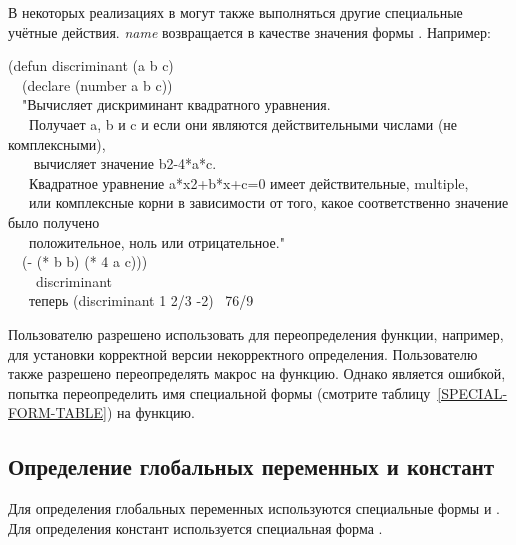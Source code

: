 \begin{defmac}
В некоторых реализациях в  могут также выполняться другие специальные
учётные действия. \emph{name} возвращается в качестве значения формы .
Например:
\begin{lisp}
(defun discriminant (a b c) \\
~~(declare (number a b c)) \\
~~"Вычисляет дискриминант квадратного уравнения. \\
~~~Получает a, b и c и если они являются действительными числами (не комплексными), \\
~~~ вычисляет значение b{\Xcircumflex}2-4*a*c. \\
~~~Квадратное уравнение a*x{\Xcircumflex}2+b*x+c=0 имеет действительные, multiple, \\
~~~или комплексные корни в зависимости от того, какое соответственно значение было получено \\
~~~положительное, ноль или отрицательное." \\
~~(- (* b b) (* 4 a c))) \\
~~~\EV\ discriminant \\
~~~\textrm{теперь} (discriminant 1 2/3 -2) \EV\ 76/9
\end{lisp}

Пользователю разрешено использовать  для переопределения функции, например, для
установки корректной версии некорректного определения.
Пользователю также разрешено переопределять макрос на функцию.
Однако является ошибкой, попытка переопределить имя специальной формы (смотрите
таблицу~\ref{SPECIAL-FORM-TABLE}) на функцию.
\end{defmac}

\subsection{Определение глобальных переменных и констант}

Для определения глобальных переменных используются специальные формы
 и . 
Для определения констант используется специальная форма . 

